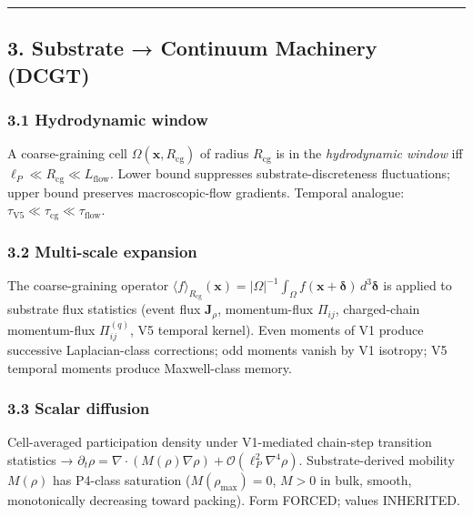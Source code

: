 \documentclass[
]{article}
\begin{document}
\begin{center}\rule{0.5\linewidth}{0.5pt}\end{center}

\subsection{3. Substrate → Continuum Machinery
(DCGT)}\label{substrate-continuum-machinery-dcgt}

\subsubsection{3.1 Hydrodynamic window}\label{hydrodynamic-window}

A coarse-graining cell \(\Omega(\mathbf{x},R_\mathrm{cg})\) of radius
\(R_\mathrm{cg}\) is in the \emph{hydrodynamic window} iff
\(\ell_P \ll R_\mathrm{cg} \ll L_\mathrm{flow}\). Lower bound suppresses
substrate-discreteness fluctuations; upper bound preserves
macroscopic-flow gradients. Temporal analogue:
\(\tau_\mathrm{V5} \ll \tau_\mathrm{cg} \ll \tau_\mathrm{flow}\).

\subsubsection{3.2 Multi-scale expansion}\label{multi-scale-expansion}

The coarse-graining operator
\(\langle f\rangle_{R_\mathrm{cg}}(\mathbf{x}) = |\Omega|^{-1}\int_\Omega f(\mathbf{x}+\boldsymbol{\delta})\,d^3\boldsymbol{\delta}\)
is applied to substrate flux statistics (event flux \(\mathbf{J}_\rho\),
momentum-flux \(\Pi_{ij}\), charged-chain momentum-flux
\(\Pi^{(q)}_{ij}\), V5 temporal kernel). Even moments of V1 produce
successive Laplacian-class corrections; odd moments vanish by V1
isotropy; V5 temporal moments produce Maxwell-class memory.

\subsubsection{3.3 Scalar diffusion}\label{scalar-diffusion}

Cell-averaged participation density under V1-mediated chain-step
transition statistics →
\(\partial_t\rho = \nabla\cdot(M(\rho)\nabla\rho) + \mathcal{O}(\ell_P^2\nabla^4\rho)\).
Substrate-derived mobility \(M(\rho)\) has P4-class saturation
(\(M(\rho_\mathrm{max}) = 0\), \(M > 0\) in bulk, smooth, monotonically
decreasing toward packing). Form FORCED; values INHERITED.
\end{document}
